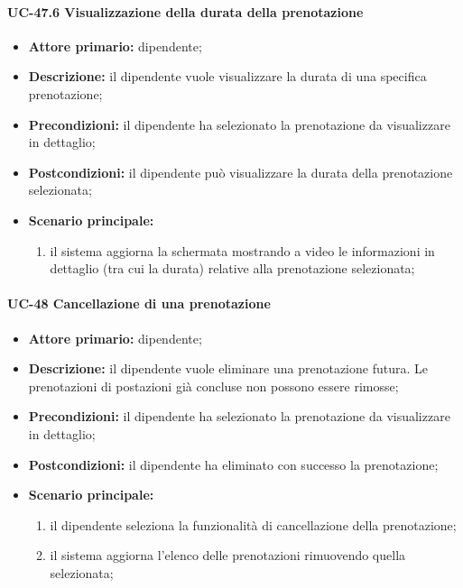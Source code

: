 \paragraph{UC-47.6 Visualizzazione della durata della prenotazione}

    \begin{itemize}
        \item \textbf{Attore primario:} dipendente;

        \item \textbf{Descrizione:} il dipendente vuole visualizzare la durata di una specifica prenotazione;

        \item \textbf{Precondizioni:} il dipendente ha selezionato la prenotazione da visualizzare in dettaglio;

        \item \textbf{Postcondizioni:} il dipendente può visualizzare la durata della prenotazione selezionata;

        \item \textbf{Scenario principale:}
            \begin{enumerate}
                \item il sistema aggiorna la schermata mostrando a video le informazioni in dettaglio (tra cui la durata) relative alla prenotazione selezionata;
            \end{enumerate}
    \end{itemize} 


\paragraph{UC-48 Cancellazione di una prenotazione}

    \begin{itemize}
        \item \textbf{Attore primario:} dipendente;

        \item \textbf{Descrizione:} il dipendente vuole eliminare una prenotazione futura. Le prenotazioni di postazioni già concluse non possono essere rimosse;

        \item \textbf{Precondizioni:} il dipendente ha selezionato la prenotazione da visualizzare in dettaglio;

        \item \textbf{Postcondizioni:} il dipendente ha eliminato con successo la prenotazione;

        \item \textbf{Scenario principale:}
            \begin{enumerate}
                \item il dipendente seleziona la funzionalità di cancellazione della prenotazione;
                \item il sistema aggiorna l'elenco delle prenotazioni rimuovendo quella selezionata;
            \end{enumerate}
    \end{itemize} 
